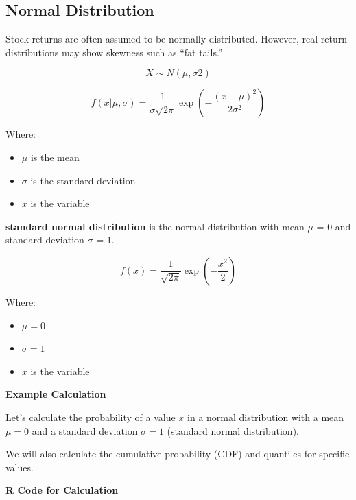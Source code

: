 \documentclass[
]{book}
\providecommand{\tightlist}{%
  \setlength{\itemsep}{0pt}\setlength{\parskip}{0pt}}
\begin{document}
\hypertarget{normal-distribution}{%
\subsection{Normal Distribution}\label{normal-distribution}}

Stock returns are often assumed to be normally distributed. However, real return distributions may show skewness such as ``fat tails.''

\[X∼N(μ,σ2)\]

\[
f(x | \mu, \sigma) = \frac{1}{\sigma \sqrt{2\pi}} \exp\left(-\frac{(x - \mu)^2}{2\sigma^2}\right)
\]

Where:

\begin{itemize}
\tightlist
\item
  \(\mu\) is the mean
\item
  \(\sigma\) is the standard deviation
\item
  \(x\) is the variable
\end{itemize}

\textbf{standard normal distribution} is the normal distribution with mean \(μ\) = 0 and standard deviation \(σ\) = 1.

\[
f(x) = \frac{1}{\sqrt{2\pi}} \exp\left(-\frac{x^2}{2}\right)
\]

Where:

\begin{itemize}
\tightlist
\item
  \(\mu = 0\)
\item
  \(\sigma = 1\)
\item
  \(x\) is the variable
\end{itemize}

\textbf{Example Calculation}

Let's calculate the probability of a value \(x\) in a normal distribution with a mean \(\mu = 0\) and a standard deviation \(\sigma = 1\) (standard normal distribution).

We will also calculate the cumulative probability (CDF) and quantiles for specific values.

\textbf{R Code for Calculation}
\end{document}
